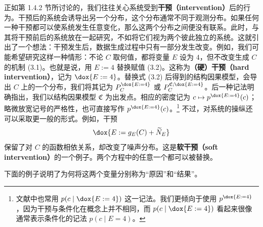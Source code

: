 正如第 1.4.2 节所讨论的，我们往往关心系统受到\textbf{干预（intervention）}后的行为。干预后的系统会诱导出另一个分布，这个分布通常不同于观测分布。如果任何一种干预都可以使系统发生任意变化，那么这两个分布之间便没有联系。此时，与其将干预前后的系统放在一起研究，不如将它们视为两个彼此独立的系统。这就引出了一个想法：干预发生后，数据生成过程中只有一部分发生改变。例如，我们可能希望研究这样一种情形：不论 $C$ 取何值，都将变量 $E$ 设为 $4$，但不改变生成 $C$ 的机制 (3.1)。也就是说，用 $E:=4$ 替换赋值 (3.2)。这称为\textbf{（硬）干预（hard intervention）}，记为 $\dox{E:=4}$。替换式 (3.2) 后得到的结构因果模型，会导出 $C$ 上的一个分布，我们将其记为 $P_C^{\dox{E:=4}}$ 或 $P_C^{\mathfrak{C};\dox{E:=4}}$。后一种记法明确指出，我们以结构因果模型 $\mathfrak{C}$ 为出发点。相应的密度记为 $c\mapsto p^{\dox{E:=4}}(c)$；略微放宽记号的严格性，也可直接写作 $p^{\dox{E:=4}}(c)$。\footnote{文献中也常用 $p(c\mid\dox{E:=4})$ 这一记法。我们更倾向于使用 $p^{\dox{E:=4}}$，因为干预与条件化在概念上并不相同，而 $p(c\mid\dox{E:=4})$ 看起来很像通常表示条件化的记法 $p(c\mid E=4)$。}
不过，对系统的操纵还可以采取更一般的形式。例如，干预
\[
 \dox{E:=g_E(C)+\widetilde N_E}
\]
保留了对 $C$ 的函数相依关系，却改变了噪声分布。这是\textbf{软干预（soft intervention）}的一个例子。两个方程中的任意一个都可以被替换。

下面的例子说明了为何将这两个变量分别称为“原因”和“结果”。

